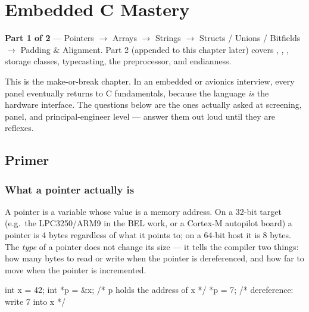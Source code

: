 
\chapter{Embedded C Mastery}
\label{ch:embedded-c}

\begin{partnote}
\textbf{Part 1 of 2} --- Pointers $\rightarrow$ Arrays $\rightarrow$ Strings
$\rightarrow$ Structs / Unions / Bitfields $\rightarrow$ Padding \& Alignment.
Part 2 (appended to this chapter later) covers , ,
, storage classes, typecasting, the preprocessor, and endianness.
\end{partnote}

This is the make-or-break chapter. In an embedded or avionics interview, every
panel eventually returns to C fundamentals, because the language \emph{is} the
hardware interface. The questions below are the ones actually asked at
screening, panel, and principal-engineer level --- answer them out loud until
they are reflexes.

\section{Primer}

\subsection{What a pointer actually is}

A pointer is a variable whose value is a memory address. On a 32-bit target
(e.g.\ the LPC3250/ARM9 in the BEL work, or a Cortex-M autopilot board) a
pointer is 4 bytes regardless of what it points to; on a 64-bit host it is
8 bytes. The \emph{type} of a pointer does not change its size --- it tells the
compiler two things: how many bytes to read or write when the pointer is
dereferenced, and how far to move when the pointer is incremented.

\begin{cgym}
int x = 42;
int *p = &x;   /* p holds the address of x    */
*p = 7;        /* dereference: write 7 into x */
\end{cgym}

